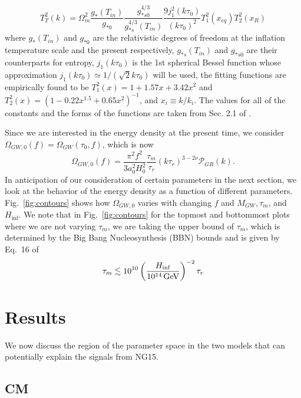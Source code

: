 \documentclass[prd,twocolumn,aps,psfig,nofootinbib,nobibnotes,superscriptaddress,preprintnumbers,times]{revtex4-2}
\newcommand{\GeV}{\,{\rm GeV}}
\begin{document}
\begin{equation}\label{eqn:24}
    T_T^2(k) = \Omega_m^2 \frac{g_*(T_{in})}{g_{*0}} \frac{g_{*s0}^{4/3}}{g_{*s}^{4/3}(T_{in})} \frac{9j_1^2(k\tau_0)}{(k\tau_0)^2}T_1^2(x_{eq}) T_2^2(x_R)
\end{equation}
where $g_{*}(T_{in})$ and $g_{*0}$ are the relativistic degrees of freedom at the inflation temperature scale and the present respectively, $g_{*s}(T_{in})$ and $g_{*s0}$ are their counterparts for entropy, $j_1(k\tau_0)$ is the 1st spherical Bessel function whose approximation $j_1(k\tau_0) \simeq 1/(\sqrt{2}k\tau_0)$ will be used, the fitting functions are empirically found to be $T_1^2(x) = 1+1.57x+3.42x^2$ and $T_2^2(x) = (1-0.22x^{1.5} + 0.65x^2)^{-1}$, and $x_i \equiv k/k_i$. The values for all of the constants and the forms of the functions are taken from Sec. 2.1 of \cite{Kuroyanagi:2015}. 

Since we are interested in the energy density at the present time, we consider $\Omega_{GW,0}(f) = \Omega_{GW}(\tau_0,f)$, which is now
\begin{equation}\label{eqn:25}
    \Omega_{GW,0}(f) = \frac{\pi^2f^2}{3a_0^2 H_0^2}\frac{\tau_m}{\tau_r}(k\tau_r)^{3-2\nu}\mathcal{P}_{GR}(k) .
\end{equation}
In anticipation of our consideration of certain parameters in the next section, we look at the behavior of the energy density as a function of different parameters. Fig.\ \ref{fig:contours} shows how $\Omega_{GW,0}$ varies with changing $f$ and $M_{GW}, \tau_m$, and $H_{\inf}$. We note that in Fig.\ \ref{fig:contours} for the topmost and bottommost plots where we are not varying $\tau_m$, we are taking the upper bound of $\tau_m$, which is determined by the Big Bang Nucleosynthesis (BBN) bounds and is given by Eq.\ 16 of \cite{Fujita:2018}
\begin{equation}\label{eqn:26}
    \tau_m \lesssim 10^{10}\left(\frac{H_{\inf}}{10^{14} \GeV}\right)^{-2}\tau_r
\end{equation}

\section{Results}\label{sec:results}
We now discuss the region of the parameter space in the two models that can potentially explain the signals from NG15. 

\subsection{CM}
\end{document}
